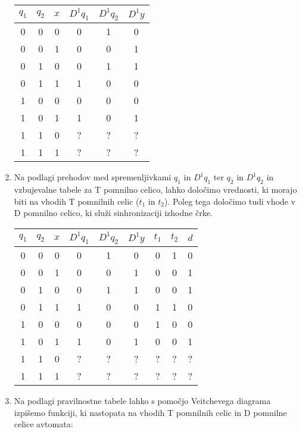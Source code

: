 \begin{resitev}
\begin{enumerate}
\begin{center}
\begin{tabular}{ccc|ccc}
 $q_1$ & $q_2$ & $x$ & $D^1 q_1$ & $D^1 q_2$ & $D^1y$\\
  \hline
 0 & 0 & 0 & 0 & 1 & 0\\		 
 0 & 0 & 1 & 0 & 0 & 1\\		 
 0 & 1 & 0 & 0 & 1 & 1\\		 
 0 & 1 & 1 & 1 & 0 & 0\\		 
 1 & 0 & 0 & 0 & 0 & 0\\		 
 1 & 0 & 1 & 1 & 0 & 1\\		 
 1 & 1 & 0 & ? & ? & ?\\		 
 1 & 1 & 1 & ? & ? & ?\\		 
\end{tabular}
\bigskip
\bigskip
\end{center}

\item Na podlagi prehodov med spremenljivkami $q_1$ in $D^1q_1$ ter $q_2$ in $D^1q_2$ in vzbujevalne tabele za T pomnilno celico, lahko določimo vrednosti, ki morajo biti na vhodih T pomnilnih celic ($t_1$ in $t_2$). Poleg tega določimo tudi vhode v D pomnilno celico, ki služi sinhronizaciji izhodne črke.

\begin{center}
\begin{tabular}{ccc|ccc|cc|c}
 $q_1$ & $q_2$ & $x$ & $D^1 q_1$ & $D^1 q_2$ & $D^1y$ & $t_1$ & $t_2$ & $d$\\
  \hline
 0 & 0 & 0 & 0 & 1 & 0 & 0 & 1 & 0\\		 
 0 & 0 & 1 & 0 & 0 & 1 & 0 & 0 & 1\\		 
 0 & 1 & 0 & 0 & 1 & 1 & 0 & 0 & 1\\		 
 0 & 1 & 1 & 1 & 0 & 0 & 1 & 1 & 0\\		 
 1 & 0 & 0 & 0 & 0 & 0 & 1 & 0 & 0\\		 
 1 & 0 & 1 & 1 & 0 & 1 & 0 & 0 & 1\\		 
 1 & 1 & 0 & ? & ? & ? & ? & ? & ?\\		 
 1 & 1 & 1 & ? & ? & ? & ? & ? & ?\\		 
\end{tabular}
\bigskip
\end{center}

\item Na podlagi pravilnostne tabele lahko s pomočjo Veitchevega diagrama izpišemo funkciji, ki nastopata na vhodih T pomnilnih celic in D pomnilne celice avtomata:



\end{enumerate}
\end{resitev}
